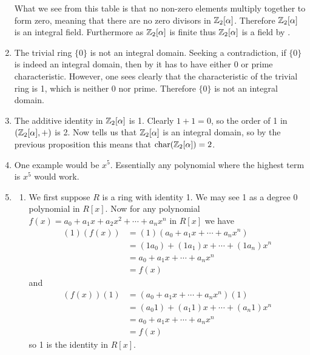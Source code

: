 \begin{enumerate}
    What we see from this table is that no non-zero elements multiply together to form zero, meaning that there are no zero divisors in $\mathbb{Z}_2[\alpha]$. Therefore $\mathbb{Z}_2[\alpha]$ is an integral field. Furthermore as $\mathbb{Z}_2[\alpha]$ is finite thus $\mathbb{Z}_2[\alpha]$ is a field by .

    \item The trivial ring $\{0\}$ is not an integral domain. Seeking a contradiction, if $\{0\}$ is indeed an integral domain, then by it has to have either 0 or prime characteristic. However, one sees clearly that the characteristic of the trivial ring is 1, which is neither 0 nor prime. Therefore $\{0\}$ is not an integral domain.

    \item The additive identity in $\mathbb{Z}_2[\alpha]$ is 1. Clearly $1 + 1 = 0$, so the order of 1 in $(\mathbb{Z}_2[\alpha],+)$ is 2. Now  tells us that $\mathbb{Z}_2[\alpha]$ is an integral domain, so by the previous proposition this means that $\mathrm{char}(\mathbb{Z}_2[\alpha]) = 2$.
    
    \item One example would be $x^5$. Essentially any polynomial where the highest term is $x^5$ would work.
    
    \item \begin{enumerate}[label=(\alph*)]
        \item We first suppose $R$ is a ring with identity 1. We may see 1 as a degree 0 polynomial in $R[x]$. Now for any polynomial $f(x) = a_0+a_1x+a_2x^2+\cdots+a_nx^n$ in $R[x]$ we have
        \begin{align*}
            (1)(f(x)) &= (1)(a_0+a_1x+\cdots+a_nx^n)\\
            &= (1a_0)+(1a_1)x+\cdots+(1a_n)x^n\\
            &= a_0+a_1x+\cdots+a_nx^n\\
            &= f(x)
        \end{align*}
        and
        \begin{align*}
            (f(x))(1) &= (a_0+a_1x+\cdots+a_nx^n)(1)\\
            &= (a_{0}1)+(a_{1}1)x+\cdots+(a_{n}1)x^n\\
            &= a_0+a_1x+\cdots+a_nx^n\\
            &= f(x)
        \end{align*}
        so 1 is the identity in $R[x]$.


\end{enumerate}
\end{enumerate}

